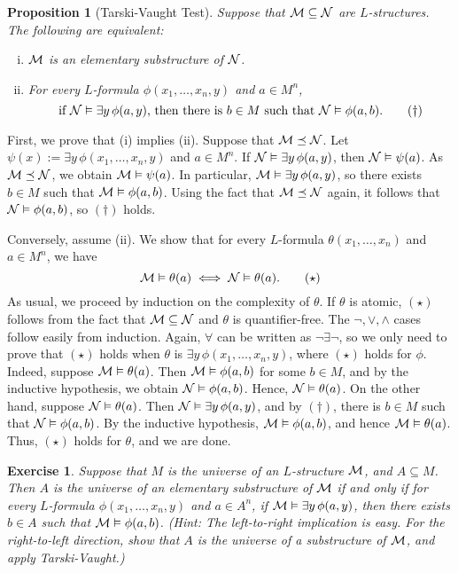 \documentclass[10pt]{article}
\makeatletter
\theoremstyle{newstyle}
\newtheorem{prop}[thm]{Proposition}
\newtheorem{exercise}[thm]{Exercise}
\newenvironment{pf}[1][\proofname]{\par
  \pushQED{\qed}%
  \normalfont \topsep0\p@\relax
  \trivlist
  \item[\hskip\labelsep\scshape
  #1\@addpunct{.}]\ignorespaces
}{%
  \popQED\endtrivlist\@endpefalse
}
\makeatother
\begin{document}
\begin{prop}[Tarski-Vaught Test]
Suppose that ${\cal M \subseteq N}$ are $L$-structures. The following are equivalent:
\begin{enumerate}[(i)]
    \item ${\cal M}$ is an elementary substructure of ${\cal N}$.
    \item For every $L$-formula $\phi(x_1, \dots, x_n, y)$ and $a \in M^n$, 
    \[ \text{if ${\cal N} \vDash \exists y \, \phi(a, y)$, then there is $b \in M$ such that 
    ${\cal N} \vDash \phi(a, b)$.} \tag{$\dagger$} \]
\end{enumerate}
\end{prop}
\begin{pf}
First, we prove that (i) implies (ii). Suppose that ${\cal M \preceq N}$. Let $\psi(x) 
:= \exists y \, \phi(x_1, \dots, x_n, y)$ and $a \in M^n$. If ${\cal N} \vDash 
\exists y \, \phi(a, y)$, then ${\cal N} \vDash \psi(a)$. As ${\cal M \preceq N}$, we obtain
${\cal M} \vDash \psi(a)$. In particular, 
${\cal M} \vDash \exists y \, \phi(a, y)$, so there exists $b \in M$ such that 
${\cal M} \vDash \phi(a, b)$. Using the fact that ${\cal M} \preceq {\cal N}$ again, it follows that 
${\cal N} \vDash \phi(a, b)$, so $(\dagger)$ holds.

Conversely, assume (ii). We show that for every $L$-formula $\theta(x_1, \dots, x_n)$ 
and $a \in M^n$, we have 
\[ {\cal M} \vDash \theta(a) \iff {\cal N} \vDash \theta(a). \tag{$\star$} \]
As usual, we proceed by induction on the complexity of $\theta$. If $\theta$ is atomic, 
$(\star)$ follows from the fact that ${\cal M \subseteq N}$ and $\theta$ is quantifier-free. 
The $\neg, \vee, \wedge$ cases follow easily from induction. Again, $\forall$ can be 
written as $\neg\exists\neg$, so we only need to prove that $(\star)$ holds when 
$\theta$ is $\exists y \, \phi(x_1, \dots, x_n, y)$, where $(\star)$ holds for $\phi$. 
Indeed, suppose ${\cal M} \vDash \theta(a)$. Then ${\cal M} \vDash \phi(a, b)$ for some 
$b \in M$, and by the inductive hypothesis, we obtain ${\cal N} \vDash \phi(a, b)$. Hence, ${\cal N} \vDash \theta(a)$. On the other hand, suppose ${\cal N} \vDash \theta(a)$. Then 
${\cal N} \vDash \exists y \, \phi(a, y)$, and by $(\dagger)$, there is 
$b \in M$ such that ${\cal N} \vDash \phi(a, b)$. By the inductive hypothesis, 
${\cal M} \vDash \phi(a, b)$, and hence ${\cal M} \vDash \theta(a)$. Thus, 
$(\star)$ holds for $\theta$, and we are done.
\end{pf}

\begin{exercise}
Suppose that $M$ is the universe of an $L$-structure ${\cal M}$, and $A \subseteq M$. 
Then $A$ is the universe of an elementary substructure of ${\cal M}$ if and only if 
for every $L$-formula $\phi(x_1, \dots, x_n, y)$ and $a \in A^n$, if 
${\cal M} \vDash \exists y \, \phi(a, y)$, then there exists $b \in A$ such that 
${\cal M} \vDash \phi(a, b)$. 
(Hint: The left-to-right implication is easy. For the right-to-left direction, show that 
$A$ is the universe of a substructure of ${\cal M}$, and apply Tarski-Vaught.)
\end{exercise}
\end{document}
